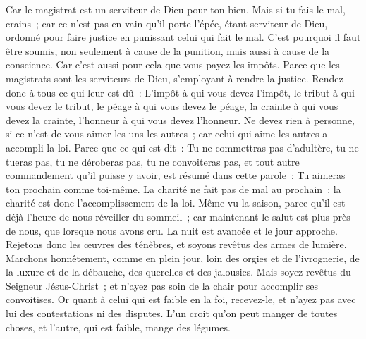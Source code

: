 \begin{multicols}{2}
Car le magistrat est un serviteur de Dieu pour ton bien. Mais si tu fais le mal, crains~; car ce n'est pas en vain qu'il porte l'épée, étant serviteur de Dieu, ordonné pour faire justice en punissant celui qui fait le mal.
C'est pourquoi il faut être soumis, non seulement à cause de la punition, mais aussi à cause de la conscience.
Car c'est aussi pour cela que vous payez les impôts. Parce que les magistrats sont les serviteurs de Dieu, s'employant à rendre la justice.
Rendez donc à tous ce qui leur est dû~: L'impôt à qui vous devez l'impôt, le tribut à qui vous devez le tribut, le péage à qui vous devez le péage, la crainte à qui vous devez la crainte, l'honneur à qui vous devez l'honneur.
Ne devez rien à personne, si ce n'est de vous aimer les uns les autres~; car celui qui aime les autres a accompli la loi.
Parce que ce qui est dit~: Tu ne commettras pas d'adultère, tu ne tueras pas, tu ne déroberas pas, tu ne convoiteras pas, et tout autre commandement qu'il puisse y avoir, est résumé dans cette parole~: Tu aimeras ton prochain comme toi-même.
La charité ne fait pas de mal au prochain~; la charité est donc l'accomplissement de la loi.
Même vu la saison, parce qu'il est déjà l’heure de nous réveiller du sommeil~; car maintenant le salut est plus près de nous, que lorsque nous avons cru.
La nuit est avancée et le jour approche. Rejetons donc les œuvres des ténèbres, et soyons revêtus des armes de lumière.
Marchons honnêtement, comme en plein jour, loin des orgies et de l'ivrognerie, de la luxure et de la débauche, des querelles et des jalousies.
Mais soyez revêtus du Seigneur Jésus-Christ~; et n'ayez pas soin de la chair pour accomplir ses convoitises.
\VerseOne{}Or quant à celui qui est faible en la foi, recevez-le, et n'ayez pas avec lui des contestations ni des disputes.
L'un croit qu'on peut manger de toutes choses, et l'autre, qui est faible, mange des légumes.

\end{multicols}
